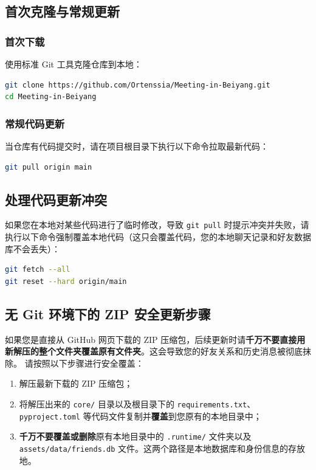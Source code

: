 \documentclass[UTF8]{ctexart}
\begin{document}
\subsection{首次克隆与常规更新}
\subsubsection{首次下载}
使用标准 Git 工具克隆仓库到本地：
\begin{lstlisting}[language=bash]
git clone https://github.com/Ortenssia/Meeting-in-Beiyang.git
cd Meeting-in-Beiyang
\end{lstlisting}

\subsubsection{常规代码更新}
当仓库有代码提交时，请在项目根目录下执行以下命令拉取最新代码：
\begin{lstlisting}[language=bash]
git pull origin main
\end{lstlisting}

\subsection{处理代码更新冲突}
如果您在本地对某些代码进行了临时修改，导致 \texttt{git pull} 时提示冲突并失败，请执行以下命令强制覆盖本地代码（这只会覆盖代码，您的本地聊天记录和好友数据库不会丢失）：
\begin{lstlisting}[language=bash]
git fetch --all
git reset --hard origin/main
\end{lstlisting}

\subsection{无 Git 环境下的 ZIP 安全更新步骤}
如果您是直接从 GitHub 网页下载的 ZIP 压缩包，后续更新时请\textbf{千万不要直接用新解压的整个文件夹覆盖原有文件夹}。这会导致您的好友关系和历史消息被彻底抹除。
请按照以下步骤进行安全覆盖：
\begin{enumerate}
    \item 解压最新下载的 ZIP 压缩包；
    \item 将解压出来的 \texttt{core/} 目录以及根目录下的 \texttt{requirements.txt}、\texttt{pyproject.toml} 等代码文件复制并\textbf{覆盖}到您原有的本地目录中；
    \item \textbf{千万不要覆盖或删除}原有本地目录中的 \texttt{.runtime/} 文件夹以及 \texttt{assets/data/friends.db} 文件。这两个路径是本地数据库和身份信息的存放地。
\end{enumerate}
\end{document}
